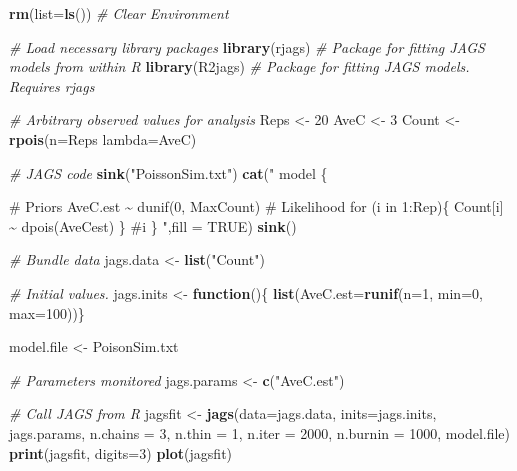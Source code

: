 \documentclass[
]{krantz}
\makeatletter
\newenvironment{Shaded}{\begin{snugshade}}{\end{snugshade}}
\newcommand{\AttributeTok}[1]{\textcolor[rgb]{0.27,0.27,0.27}{#1}}
\newcommand{\CommentTok}[1]{\textcolor[rgb]{0.37,0.37,0.37}{\textit{#1}}}
\newcommand{\ConstantTok}[1]{\textcolor[rgb]{0.37,0.37,0.37}{#1}}
\newcommand{\ControlFlowTok}[1]{\textcolor[rgb]{0.27,0.27,0.27}{\textbf{#1}}}
\newcommand{\DecValTok}[1]{\textcolor[rgb]{0.06,0.06,0.06}{#1}}
\newcommand{\FunctionTok}[1]{\textcolor[rgb]{0.27,0.27,0.27}{\textbf{#1}}}
\newcommand{\NormalTok}[1]{#1}
\newcommand{\OtherTok}[1]{\textcolor[rgb]{0.37,0.37,0.37}{#1}}
\newcommand{\StringTok}[1]{\textcolor[rgb]{0.5,0.5,0.5}{#1}}
\newenvironment{kframe}{%
\medskip{}
\setlength{\fboxsep}{.8em}
 \def\at@end@of@kframe{}%
 \ifinner\ifhmode%
  \def\at@end@of@kframe{\end{minipage}}%
  \begin{minipage}{\columnwidth}%
 \fi\fi%
 \def\FrameCommand##1{\hskip\@totalleftmargin \hskip-\fboxsep
 \colorbox{shadecolor}{##1}\hskip-\fboxsep
     \hskip-\linewidth \hskip-\@totalleftmargin \hskip\columnwidth}%
 \MakeFramed {\advance\hsize-\width
   \@totalleftmargin\z@ \linewidth\hsize
   \@setminipage}}%
 {\par\unskip\endMakeFramed%
 \at@end@of@kframe}
\renewenvironment{Shaded}{\begin{kframe}}{\end{kframe}}
\makeatother
\begin{document}
\begin{Shaded}
\begin{Highlighting}[]
\FunctionTok{rm}\NormalTok{(}\AttributeTok{list=}\FunctionTok{ls}\NormalTok{()) }\CommentTok{\# Clear Environment}

\CommentTok{\# Load necessary library packages}
\FunctionTok{library}\NormalTok{(rjags)   }\CommentTok{\# Package for fitting JAGS models from within R}
\FunctionTok{library}\NormalTok{(R2jags)  }\CommentTok{\# Package for fitting JAGS models. Requires rjags}

\CommentTok{\# Arbitrary \textquotesingle{}observed\textquotesingle{} values for analysis}
\NormalTok{Reps }\OtherTok{\textless{}{-}} \DecValTok{20}
\NormalTok{AveC }\OtherTok{\textless{}{-}} \DecValTok{3}
\NormalTok{Count }\OtherTok{\textless{}{-}} \FunctionTok{rpois}\NormalTok{(}\AttributeTok{n=}\NormalTok{Reps }\AttributeTok{lambda=}\NormalTok{AveC)}

\CommentTok{\# JAGS code}
\FunctionTok{sink}\NormalTok{(}\StringTok{"PoissonSim.txt"}\NormalTok{)}
\FunctionTok{cat}\NormalTok{(}\StringTok{"}
\StringTok{    model \{}

\StringTok{    \# Priors}
\StringTok{    AveC.est \textasciitilde{} dunif(0, MaxCount)}
\StringTok{   }
\StringTok{    \# Likelihood}
\StringTok{    for (i in 1:Rep)\{}
\StringTok{    Count[i] \textasciitilde{} dpois(AveCest)}
\StringTok{    \} \#i}
\StringTok{\}}
\StringTok{    "}\NormalTok{,}\AttributeTok{fill =} \ConstantTok{TRUE}\NormalTok{)}
\FunctionTok{sink}\NormalTok{()}

\CommentTok{\# Bundle data}
\NormalTok{jags.data }\OtherTok{\textless{}{-}} \FunctionTok{list}\NormalTok{(}\StringTok{"Count"}\NormalTok{)}

\CommentTok{\# Initial values.}
\NormalTok{jags.inits }\OtherTok{\textless{}{-}} \ControlFlowTok{function}\NormalTok{()\{ }\FunctionTok{list}\NormalTok{(}\AttributeTok{AveC.est=}\FunctionTok{runif}\NormalTok{(}\AttributeTok{n=}\DecValTok{1}\NormalTok{, }\AttributeTok{min=}\DecValTok{0}\NormalTok{, }\AttributeTok{max=}\DecValTok{100}\NormalTok{))\}}

\NormalTok{model.file }\OtherTok{\textless{}{-}} \StringTok{\textquotesingle{}PoisonSim.txt\textquotesingle{}}

\CommentTok{\# Parameters monitored}
\NormalTok{jags.params }\OtherTok{\textless{}{-}} \FunctionTok{c}\NormalTok{(}\StringTok{"AveC.est"}\NormalTok{)}

\CommentTok{\# Call JAGS from R}
\NormalTok{jagsfit }\OtherTok{\textless{}{-}} \FunctionTok{jags}\NormalTok{(}\AttributeTok{data=}\NormalTok{jags.data, }\AttributeTok{inits=}\NormalTok{jags.inits, jags.params,}
                \AttributeTok{n.chains =} \DecValTok{3}\NormalTok{, }\AttributeTok{n.thin =} \DecValTok{1}\NormalTok{, }\AttributeTok{n.iter =} \DecValTok{2000}\NormalTok{, }\AttributeTok{n.burnin =} \DecValTok{1000}\NormalTok{,}
\NormalTok{                model.file)}
\FunctionTok{print}\NormalTok{(jagsfit, }\AttributeTok{digits=}\DecValTok{3}\NormalTok{)}
\FunctionTok{plot}\NormalTok{(jagsfit)}
\end{Highlighting}
\end{Shaded}
\end{document}
